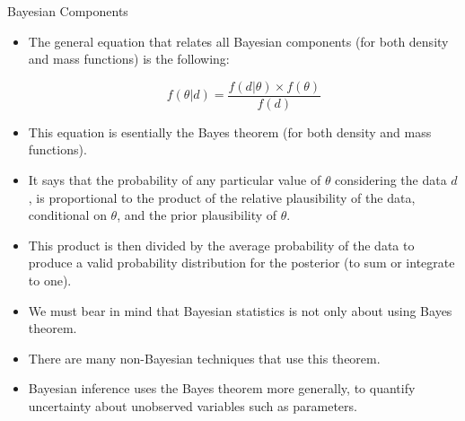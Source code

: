 \documentclass[handout]{beamer}
\begin{document}
\begin{frame}{Bayesian Components}
\scriptsize{
\begin{itemize}

\item The general equation that relates all Bayesian components (for both density and mass functions) is the following:

\begin{equation}
 f(\theta|d) = \frac{f(d|\theta) \times f(\theta)}{f(d)}
\end{equation}

\item This equation is esentially the Bayes theorem (for both density and mass functions).

\item It says that the probability of any particular value of $\theta$ considering the data $d$, is proportional to the product of the relative plausibility of the data, conditional on $\theta$, and the prior plausibility of $\theta$.

\item This product is then divided by the average probability of the data to produce a valid probability distribution for the posterior (to sum or integrate to one).

\item We must bear in mind that Bayesian statistics is not only about using Bayes theorem. 

\item There are many non-Bayesian techniques that use this theorem.

\item Bayesian inference uses the Bayes theorem more generally, to quantify uncertainty about unobserved variables such as parameters.
\end{itemize}
 } 

\end{frame}
\end{document}
